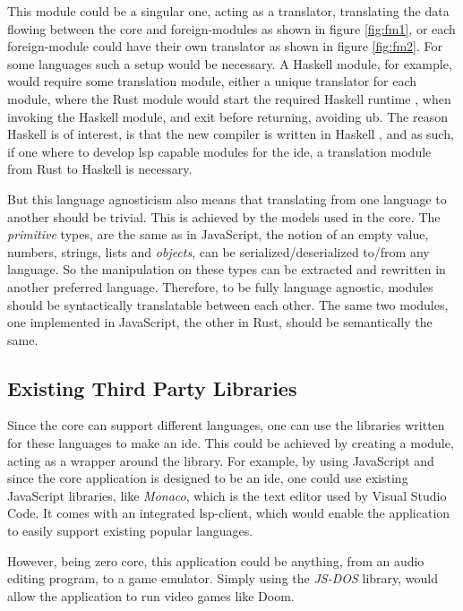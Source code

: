 This module could be a singular one, acting as a translator, translating the
data flowing between the core and foreign-modules as shown in figure
\ref{fig:fm1}, or each foreign-module could have their own translator as shown
in figure \ref{fig:fm2}. For some languages such a setup would be necessary.
A Haskell module, for example, would require some translation module, either a
unique translator for each module, where the Rust module would start the
required Haskell runtime \cite{ghcRts}, when invoking the Haskell module, and
exit before returning, avoiding \gls{ub}. The reason Haskell is of interest,
is that the new compiler is written in Haskell \cite{wiig}, and as such, if one
where to develop \gls{lsp} capable modules for the \gls{ide}, a translation
module from Rust to Haskell is necessary.


But this language agnosticism also means that translating from one language to
another should be trivial. This is achieved by the models used in the core. The
\textit{primitive} types, are the same as in JavaScript, the notion of an empty
value, numbers, strings, lists and \textit{objects}, can be
serialized/deserialized to/from any language. So the manipulation on these types
can be extracted and rewritten in another preferred language. Therefore, to be
fully language agnostic, modules should be syntactically translatable between
each other. The same two modules, one implemented in JavaScript, the other in
Rust, should be semantically the same.

\subsection{Existing Third Party Libraries}

Since the core can support different languages, one can use the libraries
written for these languages to make an \gls{ide}. This could be achieved by
creating a module, acting as a wrapper around the library. For example, by
using JavaScript and since the core application is designed to be an \gls{ide},
one could use existing JavaScript libraries, like \textit{Monaco}, which is the
text editor used by Visual Studio Code. It comes with an integrated
\gls{lsp}-client, which would enable the application to easily support existing
popular languages.

However, being zero core, this application could be anything, from an audio
editing program, to a game emulator. Simply using the \textit{JS-DOS} library,
would allow the application to run video games like Doom.

